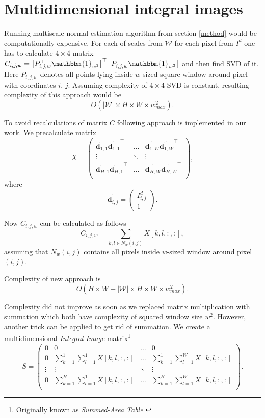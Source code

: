 \section{Multidimensional integral images} \label{integ-im}

Running multiscale normal estimation algorithm from section \ref{method} would be computationally expensive. For each of scales from $\mathcal{W}$ for each pixel from $I^d$ one has to calculate $4 \times 4$ matrix $C_{i,j,w} = \left[P_{i,j,w}^\top \mathbbm{1}_{w^2} \right]^\top \left[P_{i,j,w}^\top \mathbbm{1}_{w^2} \right]$ and then find SVD of it. Here $P_{i,j,w}$ denotes all points lying inside $w$-sized square window around pixel with coordinates $i$, $j$. Assuming complexity of $4  \times 4$ SVD is constant, resulting complexity of this approach would be 
\[
O\left(\left|\mathcal{W}\right| \times H \times W \times w_{max} ^ 2\right).
\]

To avoid recalculations of matrix $C$ following approach is implemented in our work. We precalculate matrix
\[
X = 
\begin{pmatrix}
\tilde{\bm{d}_{1,1}} \tilde{\bm{d}_{1,1}}^\top & \dots & \tilde{\bm{d}_{1,W}} \tilde{\bm{d}_{1,W}}^\top \\
\vdots & \ddots & \vdots \\
\tilde{\bm{d}_{H,1}} \tilde{\bm{d}_{H,1}}^\top & \dots & \tilde{\bm{d}_{H,W}} \tilde{\bm{d}_{H,W}}^\top \\
\end{pmatrix},
\]
where
\[
\tilde{\bm{d}_{i,j}} = \begin{pmatrix}
I^d_{i,j} \\
1
\end{pmatrix}.
\]

Now $C_{i,j,w}$ can be calculated as follows
\[
C_{i,j,w} = \sum_{k, l \in N_w(i, j)} X[k,l,:,:],
\label{eq:sum}
\]
assuming that $N_w(i, j)$ contains all pixels inside $w$-sized window around pixel $(i, j)$.

Complexity of new approach is 
\[
O\left(H \times W + \left|\mathcal{W}\right| \times H \times W \times w_{max} ^ 2\right).
\]

Complexity did not improve as soon as we replaced matrix multiplication with summation which both have complexity of squared window size $w^2$. However, another trick can be applied to get rid of summation. We create a multidimensional \textit{Integral Image} matrix\footnote{Originally known as \textit{Summed-Area Table} \cite{integral-image}}
\[
S = 
\begin{pmatrix}
0 & 0 & \dots & 0 \\
0 & \sum_{k=1}^1 \sum_{l=1}^1 X[k,l,:,:] & \dots & \sum_{k=1}^1 \sum_{l = 1}^W X[k,l,:,:] \\
\vdots & \vdots & \ddots & \vdots \\
0 & \sum_{k=1}^H \sum_{l=1}^1 X[k,l,:,:] & \dots & \sum_{k=1}^H \sum_{l=1}^W X[k,l,:,:] \\
\end{pmatrix}.
\]

